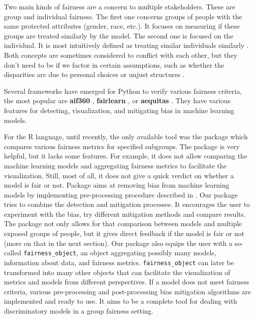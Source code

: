 Two main kinds of fairness are a concern to multiple stakeholders. These
are group and individual fairness. The first one concerns groups of
people with the same protected attributes (gender, race, etc.). It
focuses on measuring if these groups are treated similarly by the model.
The second one is focused on the individual. It is most intuitively
defined as treating similar individuals similarly
\citep{statisticalparity}. Both concepts are sometimes considered to
conflict with each other, but they don't need to be if we factor in
certain assumptions, such as whether the disparities are due to personal
choices or unjust structures \citep{reuben}.

Several frameworks have emerged for Python to verify various fairness
criteria, the most popular are \textbf{aif360} \citep{aif360-oct-2018},
\textbf{fairlearn} \citep{bird2020fairlearn}, or \textbf{aequitas}
\citep{2018aequitas}. They have various features for detecting,
visualization, and mitigating bias in machine learning models.

For the R language, until recently, the only available tool was the
 \citep{fairness} package which compares various
fairness metrics for specified subgroups. The  package is
very helpful, but it lacks some features. For example, it does not allow
comparing the machine learning models and aggregating fairness metrics
to facilitate the visualization. Still, most of all, it does not give a
quick verdict on whether a model is fair or not. Package
 aims at removing bias from machine learning models
by implementing pre-processing procedure described in
\citet{plecko2019fair}. Our package tries to combine the detection and
mitigation processes. It encourages the user to experiment with the
bias, try different mitigation methods and compare results. The package
 not only allows for that comparison between models and
multiple exposed groups of people, but it gives direct feedback if the
model is fair or not (more on that in the next section). Our package
also equips the user with a so-called \texttt{fairness\_object}, an
object aggregating possibly many models, information about data, and
fairness metrics. \texttt{fairness\_object} can later be transformed
into many other objects that can facilitate the visualization of metrics
and models from different perspectives. If a model does not meet
fairness criteria, various pre-processing and post-processing bias
mitigation algorithms are implemented and ready to use. It aims to be a
complete tool for dealing with discriminatory models in a group fairness
setting.

